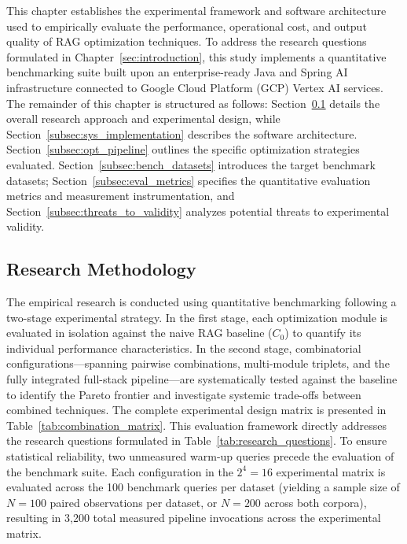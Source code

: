 This chapter establishes the experimental framework and software architecture used to empirically evaluate the performance, operational cost, and output quality of RAG optimization techniques. To address the research questions formulated in Chapter~\ref{sec:introduction}, this study implements a quantitative benchmarking suite built upon an enterprise-ready Java and Spring AI infrastructure connected to Google Cloud Platform (GCP) Vertex AI services. The remainder of this chapter is structured as follows: Section~\ref{subsec:res_methodology} details the overall research approach and experimental design, while Section~\ref{subsec:sys_implementation} describes the software architecture. Section~\ref{subsec:opt_pipeline} outlines the specific optimization strategies evaluated. Section~\ref{subsec:bench_datasets} introduces the target benchmark datasets;
Section~\ref{subsec:eval_metrics} specifies the quantitative evaluation metrics and measurement instrumentation, and Section~\ref{subsec:threats_to_validity} analyzes potential threats to experimental validity.

\subsection{Research Methodology}
\label{subsec:res_methodology}

The empirical research is conducted using quantitative benchmarking following a two-stage experimental strategy. In the first stage, each optimization module is evaluated in isolation against the naive RAG baseline ($C_0$) to quantify its individual performance characteristics. In the second stage, combinatorial configurations---spanning pairwise combinations, multi-module triplets, and the fully integrated full-stack pipeline---are systematically tested against the baseline to identify the Pareto frontier and investigate systemic trade-offs between combined techniques. The complete experimental design matrix is presented in Table~\ref{tab:combination_matrix}. This evaluation framework directly addresses the research questions formulated in Table~\ref{tab:research_questions}. To ensure statistical reliability, two unmeasured warm-up queries precede the evaluation of the benchmark suite. Each configuration in the $2^4 = 16$ experimental matrix is evaluated across the 100 benchmark queries per dataset (yielding a sample size of $N = 100$ paired observations per dataset, or $N = 200$ across both corpora), resulting in 3,200 total measured pipeline invocations across the experimental matrix.

